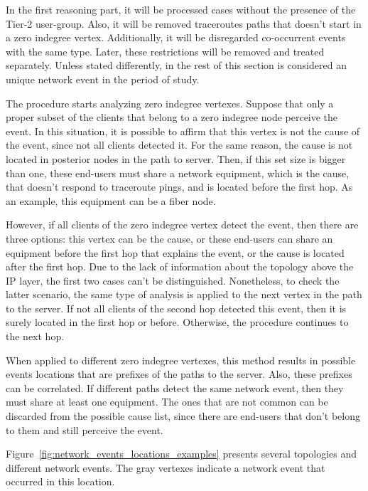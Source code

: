In the first reasoning part, it will be processed cases without the
presence of the Tier-2 user-group. Also, it will be removed
traceroutes paths that doesn't start in a zero indegree vertex.
Additionally, it will be disregarded co-occurrent events with the same type.
Later, these restrictions will be removed and treated separately.
Unless stated differently, in the rest of this section is considered an
unique network event in the period of study.

The procedure starts analyzing zero indegree vertexes.
Suppose that only a proper subset of the clients that belong to a zero
indegree node perceive the event. In this situation, it is possible to affirm
that this vertex is not the cause of the event, since not all clients detected
it. For the same reason, the cause is not located in posterior nodes
in the path to server.
Then, if this set size is bigger than one, these end-users must share
a network equipment, which is the cause, that doesn't respond to traceroute
pings, and is located before the first hop. As an example,
this equipment can be a fiber node.

However, if all clients of the zero indegree vertex detect the event, then
there are three options:
this vertex can be the cause, or these end-users can share an equipment before
the first hop that explains the event,
or the cause is located after the first hop. Due to the
lack of information about the topology above the IP layer, the first two cases
can't be
distinguished. Nonetheless, to check the latter scenario, the same type of
analysis is applied to the next vertex in the path to the server. If not all
clients of the second hop detected this event, then it is surely located
in the first hop or before. Otherwise, the procedure continues to the next hop.

When applied to different zero indegree vertexes,
this method results in possible events locations that are prefixes of
the paths to the server.
Also, these prefixes can be correlated.
If different paths detect the same network
event, then they must share at least one equipment. The
ones that are not common can be discarded from the possible cause list, since
there are end-users that don't belong to them and still perceive the event.

Figure~\ref{fig:network_events_locations_examples} presents several topologies
and different network events. The gray vertexes indicate a network event
that occurred in this location.

